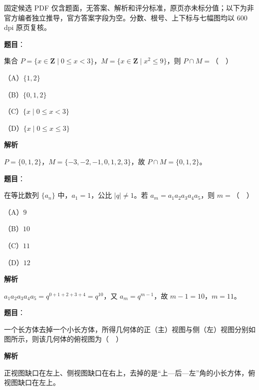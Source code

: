 

\begin{gktip}
固定候选 PDF 仅含题面，无答案、解析和评分标准，原页亦未标分值；以下为非官方编者独立推导，官方答案字段为空。分数、根号、上下标与七幅图均以 600 dpi 原页复核。
\end{gktip}

\begin{answer}

\textbf{题目}：

集合 $P=\{x\in\mathbf Z\mid0\leqslant x<3\}$，$M=\{x\in\mathbf Z\mid x^2\leqslant9\}$，则 $P\cap M=$（　）

（A）$\{1,2\}$

（B）$\{0,1,2\}$

（C）$\{x\mid0\leqslant x<3\}$

（D）$\{x\mid0\leqslant x\leqslant3\}$

\textbf{解析}

$P=\{0,1,2\}$，$M=\{-3,-2,-1,0,1,2,3\}$，故 $P\cap M=\{0,1,2\}$。


\end{answer}
\begin{answer}

\textbf{题目}：

在等比数列 $\{a_n\}$ 中，$a_1=1$，公比 $|q|\neq1$。若 $a_m=a_1a_2a_3a_4a_5$，则 $m=$（　）

（A）$9$

（B）$10$

（C）$11$

（D）$12$

\textbf{解析}

$a_1a_2a_3a_4a_5=q^{0+1+2+3+4}=q^{10}$，又 $a_m=q^{m-1}$，故 $m-1=10$，$m=11$。


\end{answer}
\begin{answer}

\textbf{题目}：

一个长方体去掉一个小长方体，所得几何体的正（主）视图与侧（左）视图分别如图所示，则该几何体的俯视图为（　）
\nopagebreak[4]
\begin{center}\end{center}
\nopagebreak[4]
\textbf{解析}

正视图缺口在左上、侧视图缺口在右上，去掉的是“上—后—左”角的小长方体，俯视图缺口在左上。


\end{answer}
